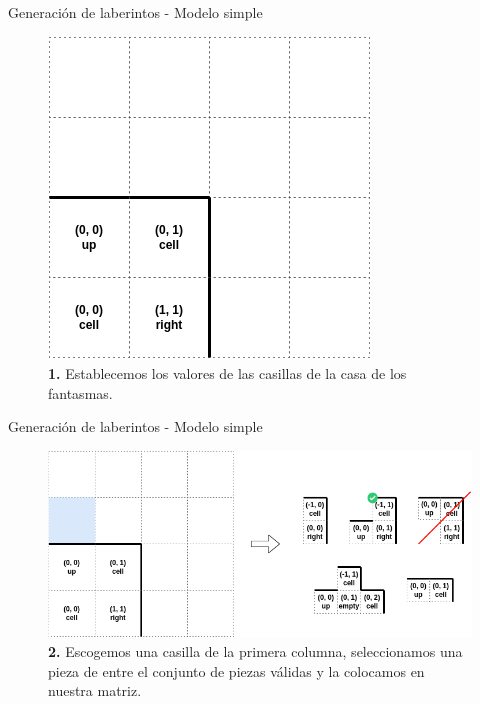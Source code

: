 \documentclass{beamer}
\begin{document}
    \begin{frame}{Generación de laberintos - Modelo simple \scriptsize{\hfill \secname}}
        \begin{figure}[H]
        \centering
            \includegraphics[scale=0.375]{img/paso1.png}
            \caption{\textbf{1.} Establecemos los valores de las casillas de la casa de los fantasmas.}
        \end{figure}
    \end{frame}
    
    \begin{frame}{Generación de laberintos - Modelo simple \scriptsize{\hfill \secname}}
        \begin{figure}[H]
        \centering
            \includegraphics[scale=0.375]{img/paso2.png}
            \caption{\textbf{2.} Escogemos una casilla de la primera columna, seleccionamos una pieza de entre el conjunto de piezas válidas y la colocamos en nuestra matriz.}
        \end{figure}
    \end{frame}
    
\end{document}
